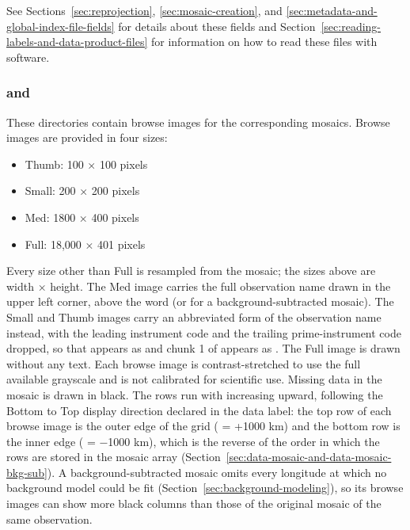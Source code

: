 See Sections~\ref{sec:reprojection}, \ref{sec:mosaic-creation}, and \ref{sec:metadata-and-global-index-file-fields} for details about these fields and Section~\ref{sec:reading-labels-and-data-product-files} for information on how to read these files with software.


\subsubsection{ and }
\label{sec:browse-mosaic-and-browse-mosaic-bkg-sub}

These directories contain browse images for the corresponding mosaics. Browse images are provided in four sizes:

\begin{itemize}
\item Thumb: 100 × 100 pixels
\item Small: 200 × 200 pixels
\item Med: 1800 × 400 pixels
\item Full: 18,000 × 401 pixels
\end{itemize}
Every size other than Full is resampled from the mosaic; the sizes above are width × height. The Med image carries the full observation name drawn in the upper left corner, above the word  (or  for a background-subtracted mosaic). The Small and Thumb images carry an abbreviated form of the observation name instead, with the leading instrument code and the trailing prime-instrument code dropped, so that  appears as  and chunk 1 of  appears as . The Full image is drawn without any text. Each browse image is contrast-stretched to use the full available grayscale and is not calibrated for scientific use. Missing data in the mosaic is drawn in black. The rows run with \dr{} increasing upward, following the Bottom to Top display direction declared in the data label: the top row of each browse image is the outer edge of the grid (\dr{} = +1000 km) and the bottom row is the inner edge (\dr{} = −1000 km), which is the reverse of the order in which the rows are stored in the mosaic array (Section~\ref{sec:data-mosaic-and-data-mosaic-bkg-sub}). A background-subtracted mosaic omits every longitude at which no background model could be fit (Section~\ref{sec:background-modeling}), so its browse images can show more black columns than those of the original mosaic of the same observation.


